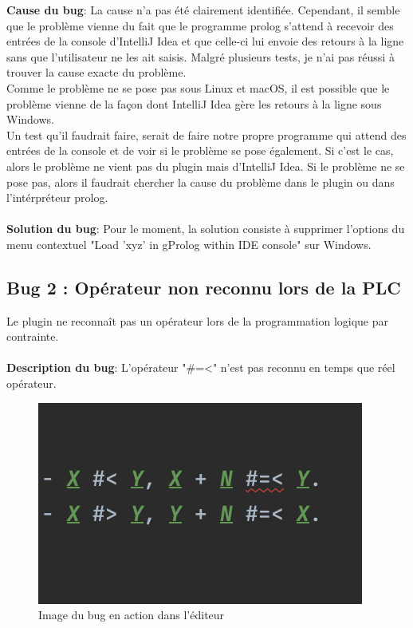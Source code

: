 \noindent \textbf{Cause du bug}: La cause n'a pas été clairement identifiée. Cependant, il semble que le problème vienne du fait que le programme prolog s'attend à recevoir des entrées de la console d'IntelliJ Idea et que celle-ci lui envoie des retours à la ligne sans que l'utilisateur ne les ait saisis. Malgré plusieurs tests, je n'ai pas réussi à trouver la cause exacte du problème.
\\
Comme le problème ne se pose pas sous Linux et macOS, il est possible que le problème vienne de la façon dont IntelliJ Idea gère les retours à la ligne sous Windows.
\\
Un test qu'il faudrait faire, serait de faire notre propre programme qui attend des entrées de la console et de voir si le problème se pose également. Si c'est le cas, alors le problème ne vient pas du plugin mais d'IntelliJ Idea. Si le problème ne se pose pas, alors il faudrait chercher la cause du problème dans le plugin ou dans l'intérpréteur prolog.
\\
\\
\textbf{Solution du bug}: Pour le moment, la solution consiste à supprimer l'options du menu contextuel "Load 'xyz' in gProlog within IDE console" sur Windows.

\subsection{Bug 2 : Opérateur non reconnu lors de la PLC}
\noindent Le plugin ne reconnaît pas un opérateur lors de la programmation logique par contrainte.
\\
\\
\textbf{Description du bug}: L'opérateur "\#=<" n'est pas reconnu en temps que réel opérateur.
\\
\begin{figure}
    \centering
    \includegraphics[scale=.85]{images/PLC_error.png}
    \caption{Image du bug en action dans l'éditeur}
    \label{fig:bug_2_plc_op}
\end{figure}

